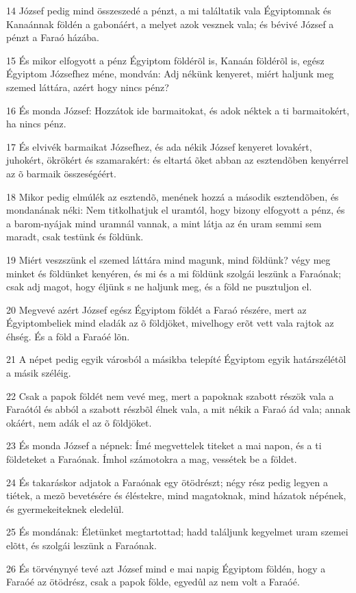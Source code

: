 \par 14 József pedig mind összeszedé a pénzt, a mi találtatik vala Égyiptomnak és Kanaánnak földén a gabonáért, a melyet azok vesznek vala; és bévivé József a pénzt a Faraó házába.
\par 15 És mikor elfogyott a pénz Égyiptom földérõl is, Kanaán földérõl is, egész Égyiptom Józsefhez méne, mondván: Adj nékünk kenyeret, miért haljunk meg szemed láttára, azért hogy nincs pénz?
\par 16 És monda József: Hozzátok ide barmaitokat, és adok néktek a ti barmaitokért, ha nincs pénz.
\par 17 És elvivék barmaikat Józsefhez, és ada nékik József kenyeret lovakért, juhokért, ökrökért és szamarakért: és eltartá õket abban az esztendõben kenyérrel az õ barmaik összeségéért.
\par 18 Mikor pedig elmúlék az esztendõ, menének hozzá a második esztendõben, és mondanának néki: Nem titkolhatjuk el uramtól, hogy bizony elfogyott a pénz, és a barom-nyájak mind uramnál vannak, a mint látja az én uram semmi sem maradt, csak testünk és földünk.
\par 19 Miért veszszünk el szemed láttára mind magunk, mind földünk? végy meg minket és földünket kenyéren, és mi és a mi földünk szolgái leszünk a Faraónak; csak adj magot, hogy éljünk s ne haljunk meg, és a föld ne pusztuljon el.
\par 20 Megvevé azért József egész Égyiptom földét a Faraó részére, mert az Égyiptombeliek mind eladák az õ földjöket, mivelhogy erõt vett vala rajtok az éhség. És a föld a Faraóé lõn.
\par 21 A népet pedig egyik városból a másikba telepíté Égyiptom egyik határszélétõl a másik széléig.
\par 22 Csak a papok földét nem vevé meg, mert a papoknak szabott részök vala a Faraótól és abból a szabott részbõl élnek vala, a mit nékik a Faraó ád vala; annak okáért, nem adák el az õ földjöket.
\par 23 És monda József a népnek: Ímé megvettelek titeket a mai napon, és a ti földeteket a Faraónak. Ímhol számotokra a mag, vessétek be a földet.
\par 24 És takaráskor adjatok a Faraónak egy ötödrészt; négy rész pedig legyen a tiétek, a mezõ bevetésére és éléstekre, mind magatoknak, mind házatok népének, és gyermekeiteknek eledelül.
\par 25 És mondának: Életünket megtartottad; hadd találjunk kegyelmet uram szemei elõtt, és szolgái leszünk a Faraónak.
\par 26 És törvénynyé tevé azt József mind e mai napig Égyiptom földén, hogy a Faraóé az ötödrész, csak a papok földe, egyedûl az nem volt a Faraóé.
